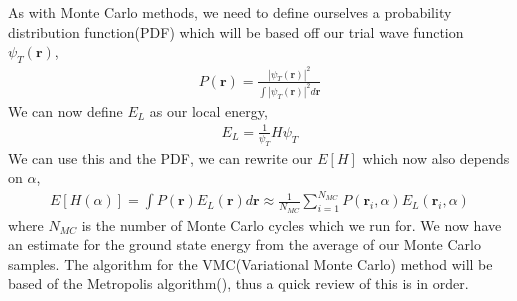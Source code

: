 \documentclass[11pt]{article}
\begin{document}
As with Monte Carlo methods, we need to define ourselves a probability distribution function(PDF) which will be based off our trial wave function $\psi_T(\mathbf{r})$,
\begin{align}
	P(\mathbf{r}) = \frac{|\psi_T(\mathbf{r})|^2}{\int |\psi_T(\mathbf{r})|^2d\mathbf{r}}
	\label{eq:pdf}
\end{align}
We can now define $E_L$ as our local energy,
\begin{align}
	E_L = \frac{1}{\psi_T}H\psi_T
	\label{eq:local-energy}
\end{align}
We can use this and the PDF, we can rewrite our $E[H]$ which now also depends on $\alpha$,
\begin{align*}
	E[H(\alpha)] = \int P(\mathbf{r})E_L(\mathbf{r})d\mathbf{r} \approx \frac{1}{N_{MC}}\sum^{N_{MC}}_{i=1}P(\mathbf{r}_i,\alpha)E_L(\mathbf{r}_i,\alpha)
\end{align*}
where $N_{MC}$ is the number of Monte Carlo cycles which we run for. 
We now have an estimate for the ground state energy from the average of our Monte Carlo samples. The algorithm for the VMC(Variational Monte Carlo) method will be based of the Metropolis algorithm(\cite{metropolis}\cite{metropolis_hastings}), thus a quick review of this is in order.
\end{document}

